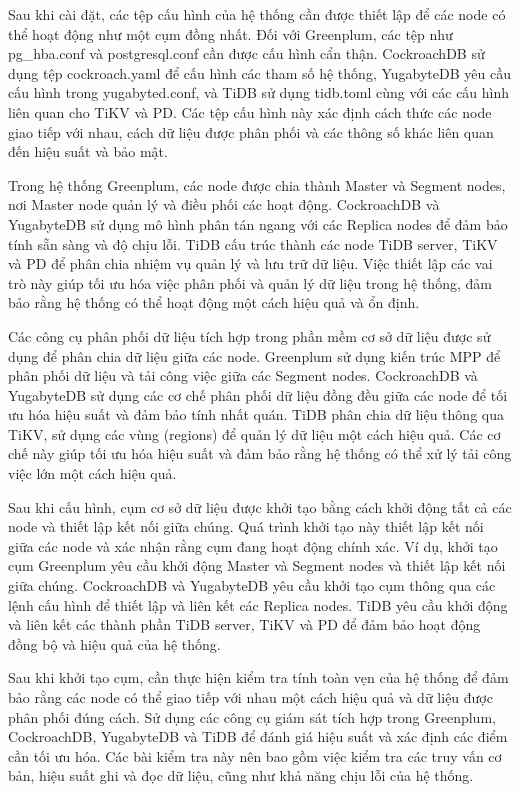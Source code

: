 \documentclass{article}[14pt]
\begin{document}
Sau khi cài đặt, các tệp cấu hình của hệ thống cần được thiết lập để các node có thể hoạt động như một cụm đồng nhất. Đối với Greenplum, các tệp như pg\_hba.conf và postgresql.conf cần được cấu hình cẩn thận. CockroachDB sử dụng tệp cockroach.yaml để cấu hình các tham số hệ thống, YugabyteDB yêu cầu cấu hình trong yugabyted.conf, và TiDB sử dụng tidb.toml cùng với các cấu hình liên quan cho TiKV và PD. Các tệp cấu hình này xác định cách thức các node giao tiếp với nhau, cách dữ liệu được phân phối và các thông số khác liên quan đến hiệu suất và bảo mật.

Trong hệ thống Greenplum, các node được chia thành Master và Segment nodes, nơi Master node quản lý và điều phối các hoạt động. CockroachDB và YugabyteDB sử dụng mô hình phân tán ngang với các Replica nodes để đảm bảo tính sẵn sàng và độ chịu lỗi. TiDB cấu trúc thành các node TiDB server, TiKV và PD để phân chia nhiệm vụ quản lý và lưu trữ dữ liệu. Việc thiết lập các vai trò này giúp tối ưu hóa việc phân phối và quản lý dữ liệu trong hệ thống, đảm bảo rằng hệ thống có thể hoạt động một cách hiệu quả và ổn định.

Các công cụ phân phối dữ liệu tích hợp trong phần mềm cơ sở dữ liệu được sử dụng để phân chia dữ liệu giữa các node. Greenplum sử dụng kiến trúc MPP để phân phối dữ liệu và tải công việc giữa các Segment nodes. CockroachDB và YugabyteDB sử dụng các cơ chế phân phối dữ liệu đồng đều giữa các node để tối ưu hóa hiệu suất và đảm bảo tính nhất quán. TiDB phân chia dữ liệu thông qua TiKV, sử dụng các vùng (regions) để quản lý dữ liệu một cách hiệu quả. Các cơ chế này giúp tối ưu hóa hiệu suất và đảm bảo rằng hệ thống có thể xử lý tải công việc lớn một cách hiệu quả.

Sau khi cấu hình, cụm cơ sở dữ liệu được khởi tạo bằng cách khởi động tất cả các node và thiết lập kết nối giữa chúng. Quá trình khởi tạo này thiết lập kết nối giữa các node và xác nhận rằng cụm đang hoạt động chính xác. Ví dụ, khởi tạo cụm Greenplum yêu cầu khởi động Master và Segment nodes và thiết lập kết nối giữa chúng. CockroachDB và YugabyteDB yêu cầu khởi tạo cụm thông qua các lệnh cấu hình để thiết lập và liên kết các Replica nodes. TiDB yêu cầu khởi động và liên kết các thành phần TiDB server, TiKV và PD để đảm bảo hoạt động đồng bộ và hiệu quả của hệ thống.

Sau khi khởi tạo cụm, cần thực hiện kiểm tra tính toàn vẹn của hệ thống để đảm bảo rằng các node có thể giao tiếp với nhau một cách hiệu quả và dữ liệu được phân phối đúng cách. Sử dụng các công cụ giám sát tích hợp trong Greenplum, CockroachDB, YugabyteDB và TiDB để đánh giá hiệu suất và xác định các điểm cần tối ưu hóa. Các bài kiểm tra này nên bao gồm việc kiểm tra các truy vấn cơ bản, hiệu suất ghi và đọc dữ liệu, cũng như khả năng chịu lỗi của hệ thống.
\end{document}
